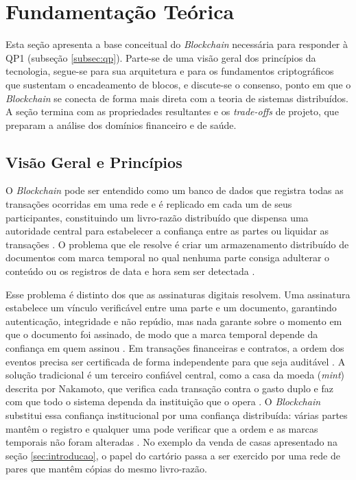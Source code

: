 \section{Fundamentação Teórica}
\label{sec:fundamentacao}

Esta seção apresenta a base conceitual do \textit{Blockchain} necessária para responder à QP1 (subseção \ref{subsec:qp}). Parte-se de uma visão geral dos princípios da tecnologia, segue-se para sua arquitetura e para os fundamentos criptográficos que sustentam o encadeamento de blocos, e discute-se o consenso, ponto em que o \textit{Blockchain} se conecta de forma mais direta com a teoria de sistemas distribuídos. A seção termina com as propriedades resultantes e os \textit{trade-offs} de projeto, que preparam a análise dos domínios financeiro e de saúde.

\subsection{Visão Geral e Princípios}
\label{subsec:visao-geral}

O \textit{Blockchain} pode ser entendido como um banco de dados que registra todas as transações ocorridas em uma rede e é replicado em cada um de seus participantes, constituindo um livro-razão distribuído que dispensa uma autoridade central para estabelecer a confiança entre as partes ou liquidar as transações \cite{Xiao2020}. O problema que ele resolve é criar um armazenamento distribuído de documentos com marca temporal no qual nenhuma parte consiga adulterar o conteúdo ou os registros de data e hora sem ser detectada \cite{di2017blockchain}.

Esse problema é distinto dos que as assinaturas digitais resolvem. Uma assinatura estabelece um vínculo verificável entre uma parte e um documento, garantindo autenticação, integridade e não repúdio, mas nada garante sobre o momento em que o documento foi assinado, de modo que a marca temporal depende da confiança em quem assinou \cite{di2017blockchain}. Em transações financeiras e contratos, a ordem dos eventos precisa ser certificada de forma independente para que seja auditável \cite{di2017blockchain}. A solução tradicional é um terceiro confiável central, como a casa da moeda (\textit{mint}) descrita por Nakamoto, que verifica cada transação contra o gasto duplo e faz com que todo o sistema dependa da instituição que o opera \cite{nakamoto2008bitcoin}. O \textit{Blockchain} substitui essa confiança institucional por uma confiança distribuída: várias partes mantêm o registro e qualquer uma pode verificar que a ordem e as marcas temporais não foram alteradas \cite{di2017blockchain}. No exemplo da venda de casas apresentado na seção \ref{sec:introducao}, o papel do cartório passa a ser exercido por uma rede de pares que mantêm cópias do mesmo livro-razão.


